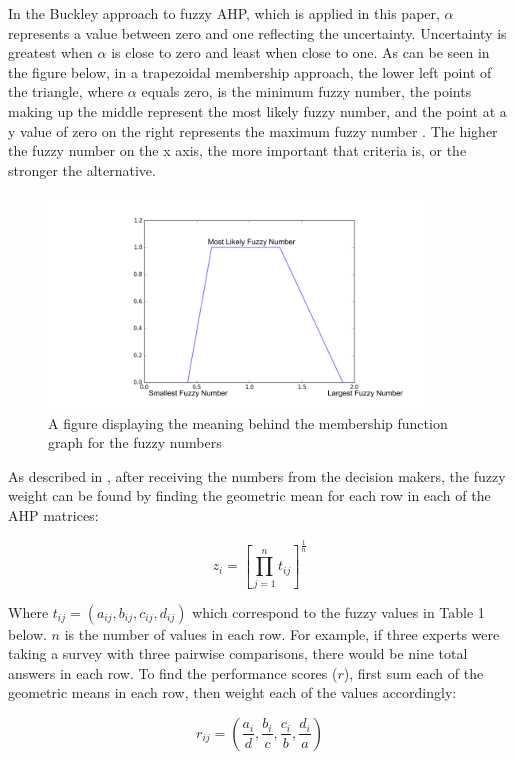 \documentclass[12pt]{UIdahoMastersThesis}
\begin{document}
 In the Buckley approach to fuzzy AHP, which is applied in this paper, $\alpha$ represents a value between zero and one reflecting the uncertainty.  Uncertainty is greatest when $\alpha$ is close to zero and least when close to one. As can be seen in the figure below, in a trapezoidal membership approach, the lower left point of the triangle, where $\alpha$ equals zero, is the minimum fuzzy number, the points making up the middle represent the most likely fuzzy number, and the point at a y value of zero on the right represents the maximum fuzzy number \cite{Pan2008}. The higher the fuzzy number on the x axis, the more important that criteria is, or the stronger the alternative.
\begin{figure}[h!]
  \caption{A figure displaying the meaning behind the membership function graph for the fuzzy numbers}
  \centering
  \includegraphics[width=0.9\textwidth]{Fuzzy_explaination.png}
\end{figure}

 As described in \cite{Kahraman2010}, after receiving the numbers from the decision makers, the fuzzy weight can be found by finding the geometric mean for each row in each of the AHP matrices:

 \begin{equation}
 z_i=[\prod_{j=1}^n t_{ij}]^{\frac{1}{n}}
 \end{equation}

 Where $t_{ij}=(a_{ij},b_{ij}, c_{ij}, d_{ij})$ which correspond to the fuzzy values in Table 1 below. $n$ is the number of values in each row.  For example, if three experts were taking a survey with three pairwise comparisons, there would be nine total answers in each row. To find the performance scores ($r$), first sum each of the geometric means in each row, then weight each of the values accordingly:

\begin{equation}
r_{ij}=(\frac{a_i}{d},\frac{b_i}{c},\frac{c_i}{b},\frac{d_i}{a})
\end{equation}
\end{document}
